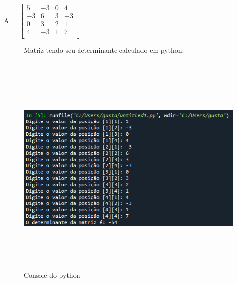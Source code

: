 \documentclass[a4paper,12pt]{article}
\begin{document}
\pagebreak
A =
$
\left[\begin{array}{cccc}
	5 & -3 & 0 & 4\\
   -3 & 6 & 3 & -3\\
    0 & 3 & 2 & 1\\
    4 & -3 & 1 & 7\\
\end{array}\right]
$
\\
\begin{figure}[h]
Matriz tendo seu determinante calculado em python:\\\\\\
    \centering
    \includegraphics[height=10cm,width=15cm]{console2.png}
    \caption{Console do python}
    \label{fig:my_label}
\end{figure}
\end{document}
